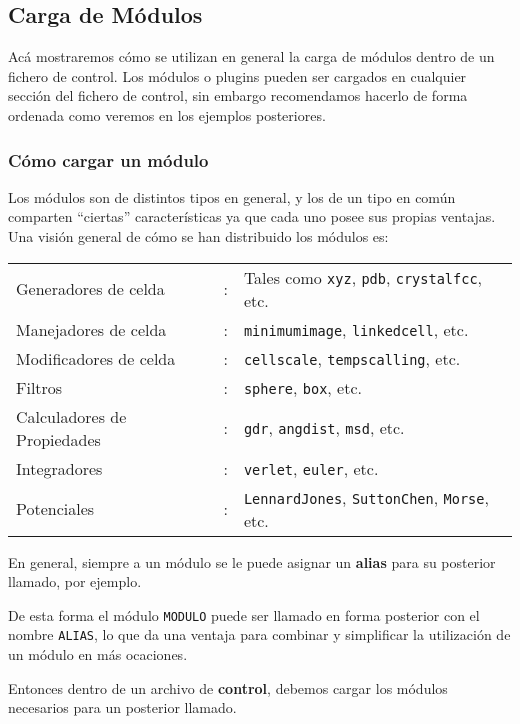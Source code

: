 \subsection{Carga de M\'odulos}

Ac\'a mostraremos c\'omo se utilizan en general la carga de m\'odulos dentro de un fichero de control. Los m\'odulos o plugins pueden ser cargados en cualquier secci\'on del fichero de control, sin embargo recomendamos hacerlo de forma ordenada como veremos en los ejemplos posteriores.

\subsubsection{C\'omo cargar un m\'odulo}

Los m\'odulos son de distintos tipos en general, y los de un tipo en com\'un comparten ``ciertas'' caracter\'isticas ya que cada uno posee sus propias ventajas. Una visi\'on general de c\'omo se han distribuido los m\'odulos es: 

\begin{tabular}{lcl}
 Generadores de celda & : & Tales como \verb|xyz|, \verb|pdb|, \verb|crystalfcc|, etc. \\
 Manejadores de celda & : &\verb|minimumimage|, \verb|linkedcell|, etc. \\
 Modificadores de celda & : &\verb|cellscale|, \verb|tempscalling|, etc.\\
 Filtros & : &\verb|sphere|, \verb|box|, etc.\\
 Calculadores de Propiedades & : & \verb|gdr|, \verb|angdist|, \verb|msd|, etc. \\
 Integradores & : & \verb|verlet|, \verb|euler|, etc. \\
 Potenciales & : & \verb|LennardJones|, \verb|SuttonChen|, \verb|Morse|, etc. \\
\end{tabular}

En general, siempre a un m\'odulo se le puede asignar un \textbf{alias} para su posterior llamado, por ejemplo.


De esta forma el m\'odulo \texttt{MODULO} puede ser llamado en forma posterior con el nombre \texttt{ALIAS}, lo que da una ventaja para combinar y simplificar la utilizaci\'on de un m\'odulo en m\'as ocaciones.

Entonces dentro de un archivo de \textbf{control}, debemos cargar los m\'odulos necesarios para un posterior llamado.

